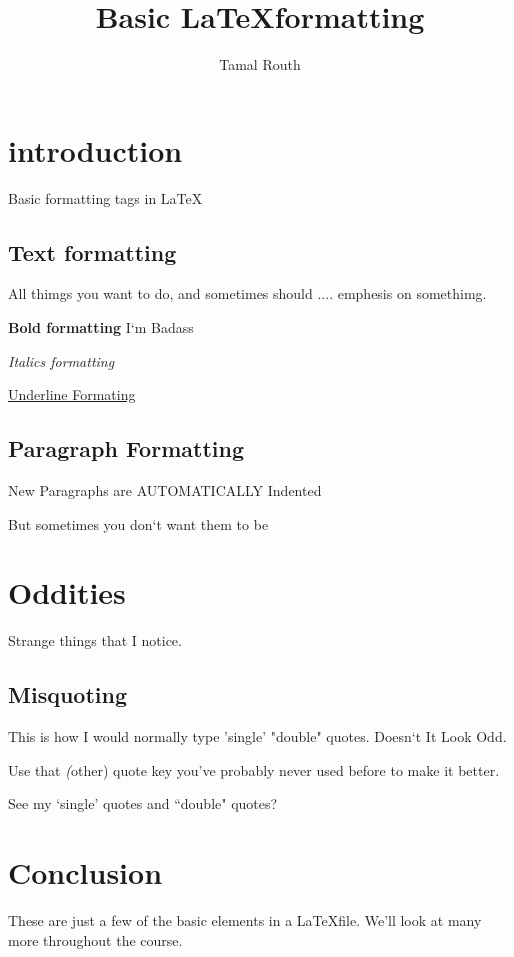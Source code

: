 \documentclass{article}
\title{Basic \LaTeX formatting}
\author{Tamal Routh}
\date{}
\begin{document}
\maketitle

\section{introduction}

Basic formatting tags in \LaTeX

\subsection{Text formatting}

All thimgs you want to do, and sometimes should .... emphesis on somethimg.

\textbf{Bold formatting} I`m  Badass


\emph{Italics formatting}

\underline{Underline Formating}

\subsection{Paragraph Formatting}

New Paragraphs are AUTOMATICALLY Indented

\noindent But sometimes you don`t want them to be

\section{Oddities}

Strange things that I notice.

\subsection{Misquoting}

This is how I would normally type 'single' "double" quotes. Doesn`t It Look Odd.

\noindent Use that \emph(other) quote key you've probably never used before to make it better.

\noindent See my `single' quotes and ``double" quotes?

\section{Conclusion}

These are just a few of the basic elements in a \LaTeX file. We'll look at many more throughout the course.
\end{document}
